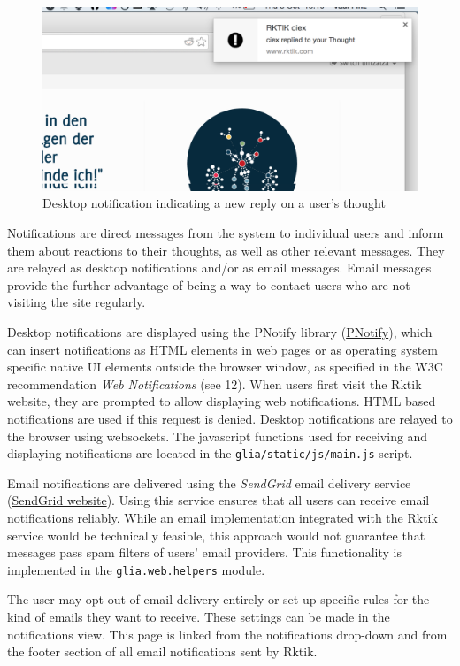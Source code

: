 \begin{figure}[htbp]
\centering
\includegraphics{img/desktop_notification.png}
\caption{Desktop notification indicating a new reply on a user's
thought}
\end{figure}

Notifications are direct messages from the system to individual users
and inform them about reactions to their thoughts, as well as other
relevant messages. They are relayed as desktop notifications and/or as
email messages. Email messages provide the further advantage of being a
way to contact users who are not visiting the site regularly.

Desktop notifications are displayed using the PNotify library
(\href{http://sciactive.github.io/pnotify/}{PNotify}), which can insert
notifications as HTML elements in web pages or as operating system
specific native UI elements outside the browser window, as specified in
the W3C recommendation \emph{Web Notifications} (see 12). When users
first visit the Rktik website, they are prompted to allow displaying web
notifications. HTML based notifications are used if this request is
denied. Desktop notifications are relayed to the browser using
websockets. The javascript functions used for receiving and displaying
notifications are located in the \texttt{glia/static/js/main.js} script.

Email notifications are delivered using the \emph{SendGrid} email
delivery service (\href{https://sendgrid.com/}{SendGrid website}). Using
this service ensures that all users can receive email notifications
reliably. While an email implementation integrated with the Rktik
service would be technically feasible, this approach would not guarantee
that messages pass spam filters of users' email providers. This
functionality is implemented in the \texttt{glia.web.helpers} module.

The user may opt out of email delivery entirely or set up specific rules
for the kind of emails they want to receive. These settings can be made
in the notifications view. This page is linked from the notifications
drop-down and from the footer section of all email notifications sent by
Rktik.

